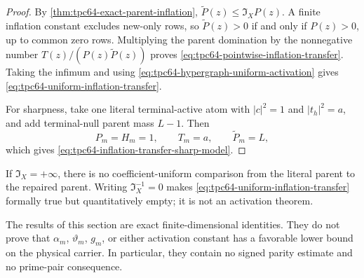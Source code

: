 \begin{proof}
By \cref{thm:tpc64-exact-parent-inflation},
\(\widetilde P(z)\le\mathfrak I_XP(z)\).  A finite inflation constant
excludes new-only rows, so \(\widetilde P(z)>0\) if and only if
\(P(z)>0\), up to common zero rows.  Multiplying the parent domination by
the nonnegative number \(T(z)/(P(z)\widetilde P(z))\) proves
\eqref{eq:tpc64-pointwise-inflation-transfer}.  Taking the infimum and
using \eqref{eq:tpc64-hypergraph-uniform-activation} gives
\eqref{eq:tpc64-uniform-inflation-transfer}.

For sharpness, take one literal terminal-active atom with
\(|c|^2=1\) and \(|t_h|^2=a\), and add terminal-null parent mass \(L-1\).
Then
\[
 P_m=H_m=1,\qquad T_m=a,\qquad
 \widetilde P_m=L,
\]
which gives \eqref{eq:tpc64-inflation-transfer-sharp-model}.
\end{proof}

If \(\mathfrak I_X=+\infty\), there is no coefficient-uniform comparison
from the literal parent to the repaired parent.  Writing
\(\mathfrak I_X^{-1}=0\) makes
\eqref{eq:tpc64-uniform-inflation-transfer} formally true but
quantitatively empty; it is not an activation theorem.

The results of this section are exact finite-dimensional identities.  They
do not prove that \(\alpha_m\), \(\vartheta_m\), \(g_m\), or either
activation constant has a favorable lower bound on the physical carrier.
In particular, they contain no signed parity estimate and no prime-pair
consequence.
